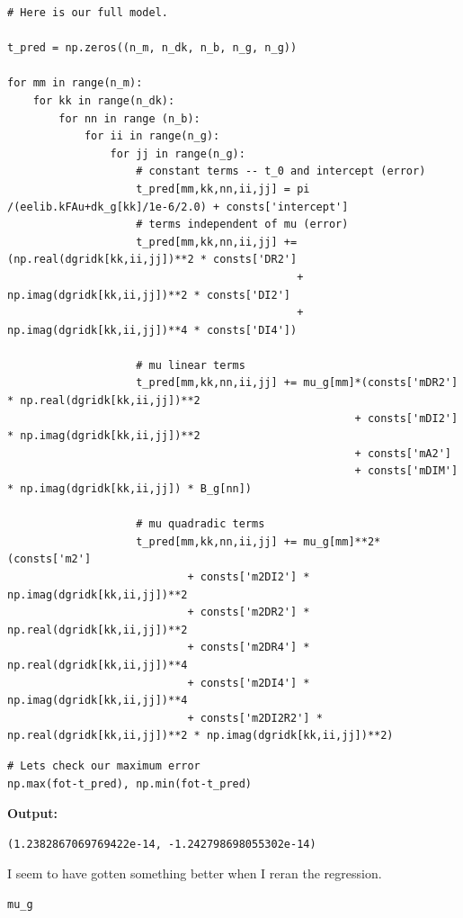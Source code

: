 \documentclass{article}
\begin{document}
\begin{lstlisting}
# Here is our full model.

t_pred = np.zeros((n_m, n_dk, n_b, n_g, n_g))

for mm in range(n_m): 
    for kk in range(n_dk):
        for nn in range (n_b):
            for ii in range(n_g):
                for jj in range(n_g):
                    # constant terms -- t_0 and intercept (error)
                    t_pred[mm,kk,nn,ii,jj] = pi /(eelib.kFAu+dk_g[kk]/1e-6/2.0) + consts['intercept']
                    # terms independent of mu (error)
                    t_pred[mm,kk,nn,ii,jj] += (np.real(dgridk[kk,ii,jj])**2 * consts['DR2'] 
                                             + np.imag(dgridk[kk,ii,jj])**2 * consts['DI2'] 
                                             + np.imag(dgridk[kk,ii,jj])**4 * consts['DI4'])

                    # mu linear terms
                    t_pred[mm,kk,nn,ii,jj] += mu_g[mm]*(consts['mDR2'] * np.real(dgridk[kk,ii,jj])**2
                                                      + consts['mDI2'] * np.imag(dgridk[kk,ii,jj])**2
                                                      + consts['mA2']
                                                      + consts['mDIM'] * np.imag(dgridk[kk,ii,jj]) * B_g[nn])

                    # mu quadradic terms
                    t_pred[mm,kk,nn,ii,jj] += mu_g[mm]**2*(consts['m2']
                            + consts['m2DI2'] * np.imag(dgridk[kk,ii,jj])**2
                            + consts['m2DR2'] * np.real(dgridk[kk,ii,jj])**2 
                            + consts['m2DR4'] * np.real(dgridk[kk,ii,jj])**4 
                            + consts['m2DI4'] * np.imag(dgridk[kk,ii,jj])**4
                            + consts['m2DI2R2'] * np.real(dgridk[kk,ii,jj])**2 * np.imag(dgridk[kk,ii,jj])**2)\end{lstlisting}

\begin{lstlisting}
# Lets check our maximum error
np.max(fot-t_pred), np.min(fot-t_pred)\end{lstlisting}

\textbf{Output:}\begin{verbatim}
(1.2382867069769422e-14, -1.242798698055302e-14)
\end{verbatim}

I seem to have gotten something better when I reran the regression.

\begin{lstlisting}
mu_g\end{lstlisting}
\end{document}
